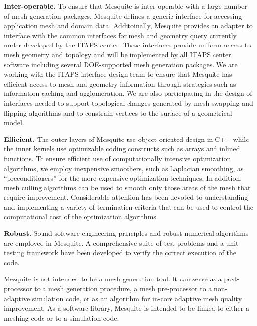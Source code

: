 {\bf Inter-operable.}  To ensure that Mesquite is inter-operable with a
large number of mesh generation packages, Mesquite defines a generic
interface for accessing application mesh and domain data.  Additoinally,
Mesquite provides an adapter to interface with the common
interfaces for mesh and geometry query currently under developed by the
ITAPS center.  These interfaces provide uniform access to mesh geometry and
topology and will be implemented by all ITAPS center software including
several DOE-supported mesh generation packages.  We are working with
the ITAPS interface design team to ensure that Mesquite has efficient
access to mesh and geometry information through strategies such as
information caching and agglomeration.  We are also participating in
the design of interfaces needed to support topological changes
generated by mesh swapping and flipping algorithms and to constrain
vertices to the surface of a geometrical model. \newline

{\bf Efficient.}  The outer layers of Mesquite use
object-oriented design in C++ while the inner kernels use
optimizable coding constructs such as arrays and inlined
functions.  To ensure efficient use of computationally intensive
optimization algorithms, we employ inexpensive smoothers, such as
Laplacian smoothing, as ``preconditioners'' for the more expensive
optimization techniques.  In addition, mesh culling algorithms can be
used to smooth only those areas of the mesh that require improvement.
Considerable attention has been devoted to understanding and
implementing a variety of termination criteria that can be used to
control the computational cost of the optimization algorithms. \newline

{\bf Robust.} Sound software engineering principles and robust numerical
algorithms are employed in Mesquite.
A comprehensive suite of test problems and a unit testing framework have
been developed to verify the correct execution of the code. \newline

Mesquite is not intended to be a mesh generation tool. It can serve as
a post-processor to a mesh generation procedure, a mesh pre-processor to a
non-adaptive simulation code, or as an algorithm for in-core adaptive mesh
quality improvement. As a software library, Mesquite is intended to be
linked to either a meshing code or to a simulation code. \newline

